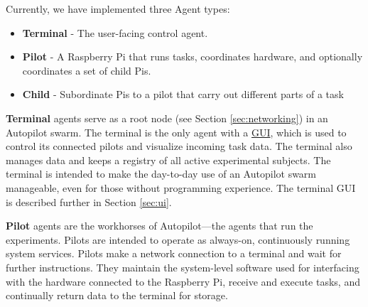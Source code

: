 \clearpage

Currently, we have implemented three Agent types: 

\begin{itemize}
    \item \textbf{Terminal} - The user-facing control agent.
    \item \textbf{Pilot} - A Raspberry Pi that runs tasks, coordinates hardware, and optionally coordinates a set of child Pis.
    \item \textbf{Child} - Subordinate Pis to a pilot that carry out different parts of a task
\end{itemize}

\textbf{Terminal} agents serve as a root node (see Section \ref{sec:networking}) in an Autopilot swarm. The terminal is the only agent with a \hyperref[sec:ui]{GUI}, which is used to control its connected pilots and visualize incoming task data. The terminal also manages data and keeps a registry of all active experimental subjects. The terminal is intended to make the day-to-day use of an Autopilot swarm manageable, even for those without programming experience. The terminal GUI is described further in Section \ref{sec:ui}.

\textbf{Pilot} agents are the workhorses of Autopilot---the agents that run the experiments. Pilots are intended to operate as always-on, continuously running system services. Pilots make a network connection to a terminal and wait for further instructions. They maintain the system-level software used for interfacing with the hardware connected to the Raspberry Pi, receive and execute tasks, and continually return data to the terminal for storage. 

